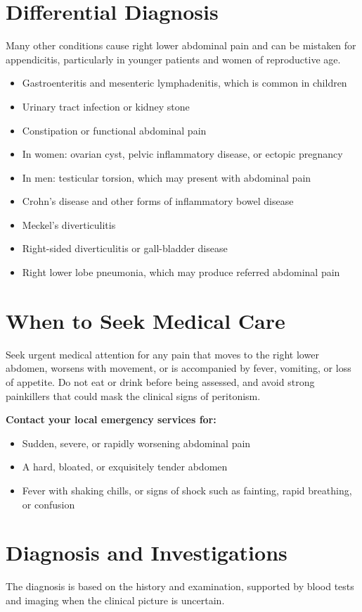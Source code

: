 \section*{Differential Diagnosis}
Many other conditions cause right lower abdominal pain and can be mistaken for appendicitis, particularly in younger patients and women of reproductive age.

\begin{itemize}
    \item Gastroenteritis and mesenteric lymphadenitis, which is common in children
    \item Urinary tract infection or kidney stone
    \item Constipation or functional abdominal pain
    \item In women: ovarian cyst, pelvic inflammatory disease, or ectopic pregnancy
    \item In men: testicular torsion, which may present with abdominal pain
    \item Crohn's disease and other forms of inflammatory bowel disease
    \item Meckel's diverticulitis
    \item Right-sided diverticulitis or gall-bladder disease
    \item Right lower lobe pneumonia, which may produce referred abdominal pain
\end{itemize}

\section*{When to Seek Medical Care}
Seek urgent medical attention for any pain that moves to the right lower abdomen, worsens with movement, or is accompanied by fever, vomiting, or loss of appetite. Do not eat or drink before being assessed, and avoid strong painkillers that could mask the clinical signs of peritonism.

\textbf{Contact your local emergency services for:}
\begin{itemize}
    \item Sudden, severe, or rapidly worsening abdominal pain
    \item A hard, bloated, or exquisitely tender abdomen
    \item Fever with shaking chills, or signs of shock such as fainting, rapid breathing, or confusion
\end{itemize}

\section*{Diagnosis and Investigations}
The diagnosis is based on the history and examination, supported by blood tests and imaging when the clinical picture is uncertain.

